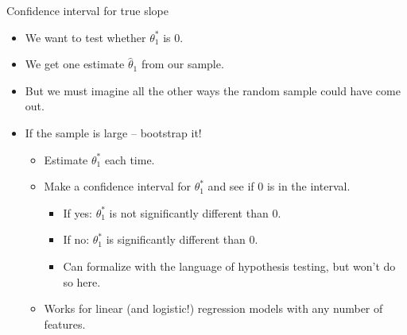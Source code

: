 \documentclass[aspectratio=169]{../latex_main/tntbeamer}  %
\begin{document}
	\begin{frame}{Confidence interval for true slope}
	    \begin{itemize}
	        \item We want to test whether   $\theta^*_1$    is 0.
	        \item We get one estimate  $\hat{\theta}_1$    from our sample.
	        \item But we must imagine all the other ways the random sample could have come out.
	        \item If the sample is large – bootstrap it! 
	        \begin{itemize}
	            \item Estimate   $\theta^*_1$     each time.
	            \item Make a confidence interval for    $\theta^*_1$     and see if 0 is in the interval.
	            \begin{itemize}
	                \item If yes:   $\theta^*_1$     is not significantly different than 0.
	                \item If no:   $\theta^*_1$     is significantly different than 0.
	                \item Can formalize with the language of hypothesis testing, but won’t do so here.
	            \end{itemize}
                \item Works for linear (and logistic!) regression models with any number of features.
	        \end{itemize}
	    \end{itemize}
	\end{frame}
	
	
\end{document}
